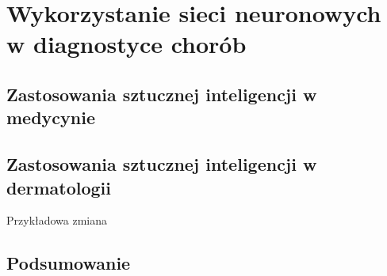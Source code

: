 
\def\filename{rozdzial2}

\chapter{Wykorzystanie sieci neuronowych w diagnostyce chorób}

\section{Zastosowania sztucznej inteligencji w medycynie}

\section{Zastosowania sztucznej inteligencji w dermatologii}
Przykładowa zmiana
\section{Podsumowanie}
